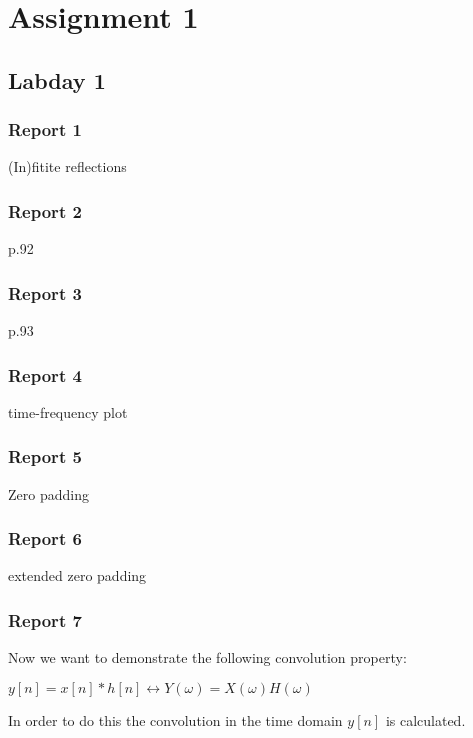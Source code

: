 \documentclass[11pt,titlepage]{report}
\begin{document}
\chapter{Assignment 1}
\section{Labday 1}
\subsection{Report 1}
(In)fitite reflections

\subsection{Report 2}
p.92
\subsection{Report 3}
p.93
\subsection{Report 4}
time-frequency plot
\subsection{Report 5}
Zero padding
\subsection{Report 6}
extended zero padding

\subsection{Report 7}
Now we want to demonstrate the following convolution property: \newline
\begin{center}
 $y[n] = x[n]*h[n] \leftrightarrow Y(\omega) = X(\omega)H(\omega)$ 
\end{center}
In order to do this the convolution in the time domain $y[n]$ is calculated. 
\end{document}
